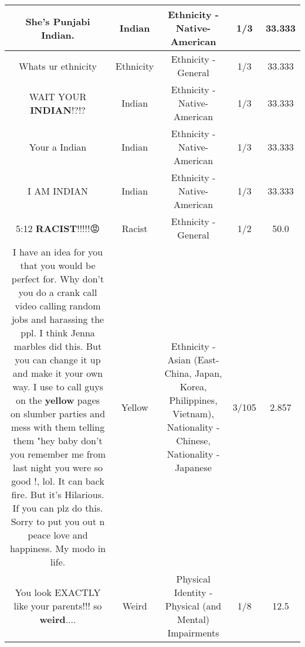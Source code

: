 \documentclass[11pt]{article}
\newlength\mylength
\begin{document}
\begin{center}
\begin{longtable}{|C{.65\mylength}|C{.30\mylength}|C{.12\mylength}|C{.12\mylength}|C{.12\mylength}|}
  \small She's Punjabi \textbf{Indian}.\normalsize   & Indian & Ethnicity - Native-American & 1/3 & 33.333 \\  \hline
  \small Whats ur ethnicity\normalsize   & Ethnicity & Ethnicity - General & 1/3 & 33.333 \\  \hline
  \small WAIT YOUR \textbf{INDIAN}!?!?\normalsize   & Indian & Ethnicity - Native-American & 1/3 & 33.333 \\  \hline
  \small Your a Indian\normalsize   & Indian & Ethnicity - Native-American & 1/3 & 33.333 \\  \hline
  \small I AM INDIAN\normalsize   & Indian & Ethnicity - Native-American & 1/3 & 33.333 \\  \hline
  \small 5:12 \textbf{RACIST}!!!!!😡\normalsize   & Racist & Ethnicity - General & 1/2 & 50.0 \\  \hline
  \small I have an idea for you that you would be perfect for. Why don't you do a crank call video calling random jobs and harassing the ppl. I think Jenna marbles did this. But you can change it up and make it your own way. I use to call guys on the \textbf{y\textbf{e\textbf{llow}}} pages on slumber parties and mess with them telling them "hey baby don't you remember me from last night you were so good !, lol. It can back fire. But it's Hilarious. If you can plz do this. Sorry to put you out n peace love and happiness. My modo in life.\normalsize   & Yellow & Ethnicity - Asian (East- China, Japan, Korea, Philippines, Vietnam), Nationality - Chinese, Nationality - Japanese & 3/105 & 2.857 \\  \hline
  \small You look EXACTLY like your parents!!! so \textbf{weird}....\normalsize   & Weird & Physical Identity - Physical (and Mental) Impairments & 1/8 & 12.5 \\  \hline

\end{longtable}
\end{center}
\end{document}
